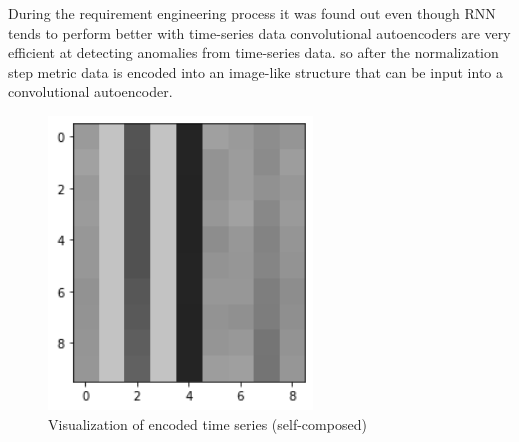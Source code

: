 During the requirement engineering process it was found out even though RNN tends to perform better with time-series data convolutional autoencoders are very efficient at detecting anomalies from time-series data. so after the normalization step metric data is encoded into an image-like structure that can be input into a convolutional autoencoder.

\begin{figure}[H]
    \includegraphics[width=7cm]{assets/implementation/visualize-representation.png}
    \caption{Visualization of encoded time series (self-composed)}
    \label{fig:visualize-representation}
\end{figure}